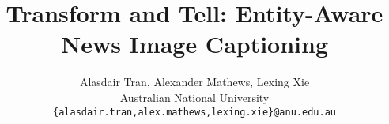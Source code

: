 \documentclass[10pt,twocolumn,letterpaper]{article}
\begin{document}
\title{Transform and Tell: Entity-Aware News Image Captioning}

\author{Alasdair Tran, Alexander Mathews, Lexing Xie\\
Australian National University\\
{\tt\small \{alasdair.tran,alex.mathews,lexing.xie\}@anu.edu.au}
}

\maketitle









{\small


}

\clearpage


\end{document}
